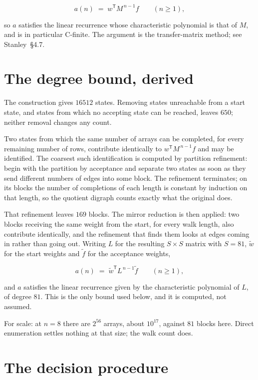 \documentclass[11pt]{article}
\theoremstyle{definition}
\begin{document}
\[a(n) \;=\; w^{\mathsf T} M^{\,n-1} f \qquad (n \ge 1),\]

so $a$ satisfies the linear recurrence whose characteristic polynomial is that of $M$, and is in particular C-finite. The argument is the transfer-matrix method; see Stanley~\S4.7.

\section{The degree bound, derived}

The construction gives $16512$ states. Removing states unreachable from a start state, and states from which no accepting state can be reached, leaves $650$; neither removal changes any count.

Two states from which the same number of arrays can be completed, for every remaining number of rows, contribute identically to $w^{\mathsf T}M^{\,n-1}f$ and may be identified. The coarsest such identification is computed by partition refinement: begin with the partition by acceptance and separate two states as soon as they send different numbers of edges into some block. The refinement terminates; on its blocks the number of completions of each length is constant by induction on that length, so the quotient digraph counts exactly what the original does.

That refinement leaves $169$ blocks. The mirror reduction is then applied: two blocks receiving the same weight from the start, for every walk length, also contribute identically, and the refinement that finds them looks at edges coming in rather than going out. Writing $L$ for the resulting $S \times S$ matrix with $S = 81$, $\tilde w$ for the start weights and $\tilde f$ for the acceptance weights,

\[a(n) \;=\; \tilde w^{\mathsf T} L^{\,n-1} \tilde f \qquad (n \ge 1),\]

and $a$ satisfies the linear recurrence given by the characteristic polynomial of $L$, of degree $81$. This is the only bound used below, and it is computed, not assumed.

For scale: at $n = 8$ there are $2^{56}$ arrays, about $10^{17}$, against $81$ blocks here. Direct enumeration settles nothing at that size; the walk count does.

\section{The decision procedure}
\end{document}
